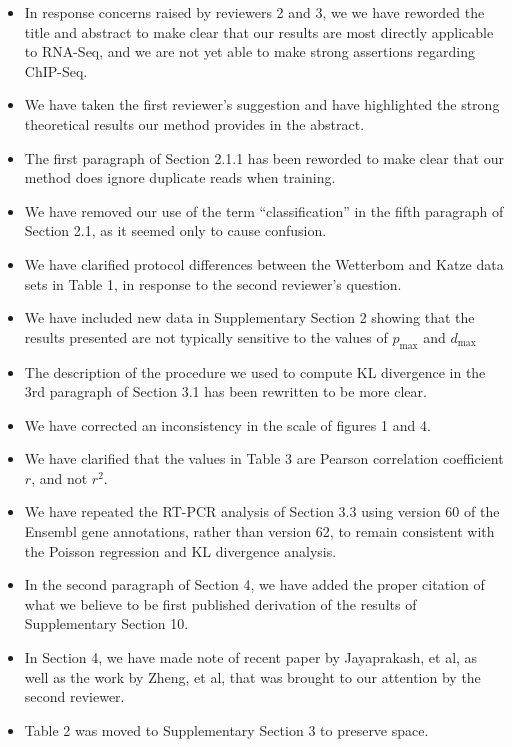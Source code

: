 \documentclass{article}
\begin{document}
\begin{itemize}
\item In response concerns raised by reviewers 2 and 3, we we have reworded the
title and abstract to make clear that our results are most directly applicable
to RNA-Seq, and we are not yet able to make strong assertions regarding
ChIP-Seq.

\item We have taken the first reviewer's suggestion and have highlighted the
strong theoretical results our method provides in the abstract.

\item The first paragraph of Section 2.1.1 has been reworded to make clear that
our method does ignore duplicate reads when training.

\item We have removed our use of the term ``classification'' in the fifth
paragraph of Section 2.1, as it seemed only to cause confusion.

\item We have clarified protocol differences between the Wetterbom and Katze
data sets in Table 1, in response to the second reviewer's question.

\item We have included new data in Supplementary Section 2 showing that the
results presented are not typically sensitive to the values of $p_{\text{max}}$
and $d_{\text{max}}$

\item The description of the procedure we used to compute KL divergence in the
3rd paragraph of Section 3.1 has been rewritten to be more clear.

\item We have corrected an inconsistency in the scale of figures 1 and 4.

\item We have clarified that the values in Table 3 are Pearson correlation
coefficient $r$, and not $r^2$.

\item We have repeated the RT-PCR analysis of Section 3.3 using version 60 of the
Ensembl gene annotations, rather than version 62, to remain consistent with the
Poisson regression and KL divergence analysis.

\item In the second paragraph of Section 4, we have added the proper citation of
what we believe to be first published derivation of the results of Supplementary
Section 10.

\item In Section 4, we have made note of recent paper by Jayaprakash, et al, as
well as the work by Zheng, et al, that was brought to our attention by the
second reviewer.

\item Table 2 was moved to Supplementary Section 3 to preserve space.

\end{itemize}
\end{document}
